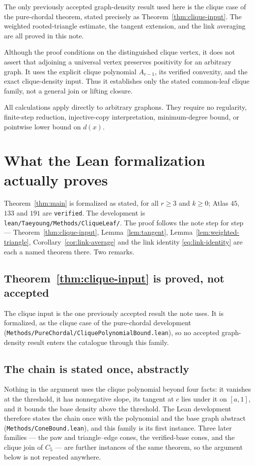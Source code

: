 \documentclass[11pt]{article}
\begin{document}
The only previously accepted graph-density result used here is the
clique case of the pure-chordal theorem, stated precisely as
Theorem~\ref{thm:clique-input}.  The weighted rooted-triangle estimate,
the tangent extension, and the link averaging are all proved in this
note.

Although the proof conditions on the distinguished clique vertex, it
does not assert that adjoining a universal vertex preserves positivity
for an arbitrary graph.  It uses the explicit clique polynomial
$A_{r-1}$, its verified convexity, and the exact clique-density input.
Thus it establishes only the stated common-leaf clique family, not a
general join or lifting closure.

All calculations apply directly to arbitrary graphons.  They require
no regularity, finite-step reduction, injective-copy interpretation,
minimum-degree bound, or pointwise lower bound on $d(x)$.

\appendix
\section{What the Lean formalization actually proves}

Theorem~\ref{thm:main} is formalized as stated, for all $r\geq3$ and $k\geq0$;
Atlas $45$, $133$ and $191$ are \texttt{verified}.  The development is
\texttt{lean/Taeyoung/Methods/CliqueLeaf/}.  The proof follows the note step
for step --- Theorem~\ref{thm:clique-input}, Lemma~\ref{lem:tangent},
Lemma~\ref{lem:weighted-triangle}, Corollary~\ref{cor:link-average} and the
link identity \eqref{eq:link-identity} are each a named theorem there.  Two
remarks.

\subsection*{Theorem~\ref{thm:clique-input} is proved, not accepted}

The clique input is the one previously accepted result the note uses.  It is
formalized, as the clique case of the pure-chordal development
(\texttt{Methods/PureChordal/CliquePolynomialBound.lean}), so no accepted
graph-density result enters the catalogue through this family.

\subsection*{The chain is stated once, abstractly}

Nothing in the argument uses the clique polynomial beyond four facts: it
vanishes at the threshold, it has nonnegative slope, its tangent at $c$ lies
under it on $[a,1]$, and it bounds the base density above the threshold.  The
Lean development therefore states the chain once with the polynomial and the
base graph abstract (\texttt{Methods/ConeBound.lean}), and this family is its
first instance.  Three later families --- the paw and triangle--edge cones, the
verified-base cones, and the clique join of $C_5$ --- are further instances of
the same theorem, so the argument below is not repeated anywhere.
\end{document}
